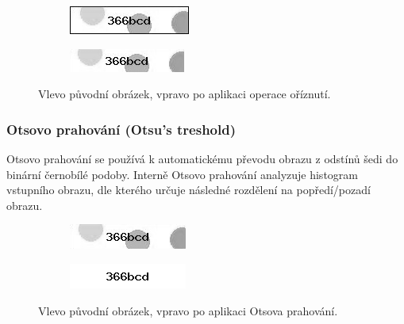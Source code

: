 \documentclass[
  field=ainfp,
  master=true,
  biblatex,
  sourcecodes=false,
  theorems=false,
  glossaries,
  index
]{kidiplom}
\begin{document}
\begin{figure}[H]
\centering
\begin{subfigure}{.5\textwidth}
  \centering
  \includegraphics[width=.8\linewidth]{images/crop_original.png}
\end{subfigure}%
\begin{subfigure}{.5\textwidth}
  \centering
  \includegraphics[width=.8\linewidth]{images/crop_result.png}
\end{subfigure}
\caption{Vlevo původní obrázek, vpravo po aplikaci operace oříznutí.}
\label{fig:crop_example}
\end{figure}

\subsubsection*{Otsovo prahování (Otsu's treshold)}
Otsovo prahování se používá k automatickému převodu obrazu z odstínů šedi do binární černobílé podoby. Interně Otsovo prahování analyzuje histogram vstupního obrazu, dle kterého určuje následné rozdělení na popředí/pozadí obrazu. 


\begin{figure}[H]
\centering
\begin{subfigure}{.5\textwidth}
  \centering
  \includegraphics[width=.8\linewidth]{images/otsu_original.png}
\end{subfigure}%
\begin{subfigure}{.5\textwidth}
  \centering
  \includegraphics[width=.8\linewidth]{images/otsu_result.png}
\end{subfigure}
\caption{Vlevo původní obrázek, vpravo po aplikaci Otsova prahování.}
\label{fig:inverse_example}
\end{figure}
\end{document}
